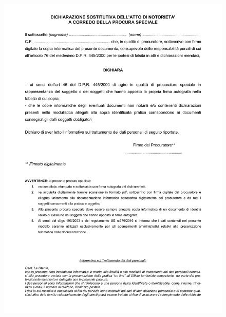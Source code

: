 \documentclass{elegantbook}
\begin{document}
		\begin{figure}[H]
			\centering
			\includegraphics[scale=0.8]{../Img/Documents/Procura/Procura-2.png}
		\end{figure}
	\newpage
\end{document}
